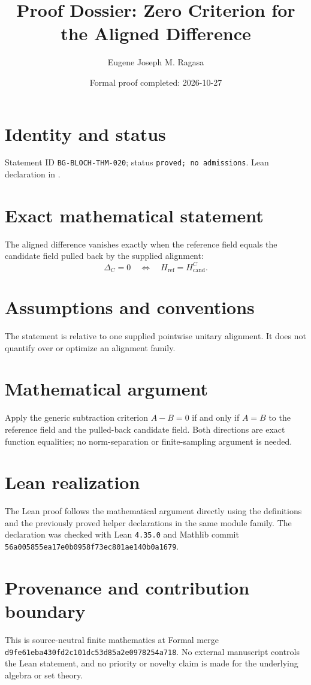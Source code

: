 \documentclass[11pt]{article}
\title{Proof Dossier: Zero Criterion for the Aligned Difference}
\author{Eugene Joseph M. Ragasa}
\date{Formal proof completed: 2026-10-27}
\begin{document}
\raggedright
\maketitle

\section{Identity and status}
Statement ID \texttt{BG-BLOCH-THM-020}; status \texttt{proved; no admissions}.  Lean declaration
 in
.

\section{Exact mathematical statement}
The aligned difference vanishes exactly when the reference field equals the candidate field pulled back by the supplied alignment:
\[
  \Delta_C=0\quad\Longleftrightarrow\quad
  H_{\mathrm{ref}}=H_{\mathrm{cand}}^{C}.
\]

\section{Assumptions and conventions}
The statement is relative to one supplied pointwise unitary alignment.  It does not quantify over or optimize an alignment family.

\section{Mathematical argument}
Apply the generic subtraction criterion $A-B=0$ if and only if $A=B$ to the reference field and the pulled-back candidate field.  Both directions are exact function equalities; no norm-separation or finite-sampling argument is needed.

\section{Lean realization}
The Lean proof follows the mathematical argument directly using the definitions and the
previously proved helper declarations in the same module family.  The declaration was checked
with Lean \texttt{4.35.0} and Mathlib commit \texttt{56a005855ea17e0b0958f73ec801ae140b0a1679}.

\section{Provenance and contribution boundary}
This is source-neutral finite mathematics at Formal merge
\texttt{d9fe61eba430fd2c101dc53d85a2e0978254a718}.  No external manuscript controls the Lean statement, and no priority or
novelty claim is made for the underlying algebra or set theory.
\end{document}
